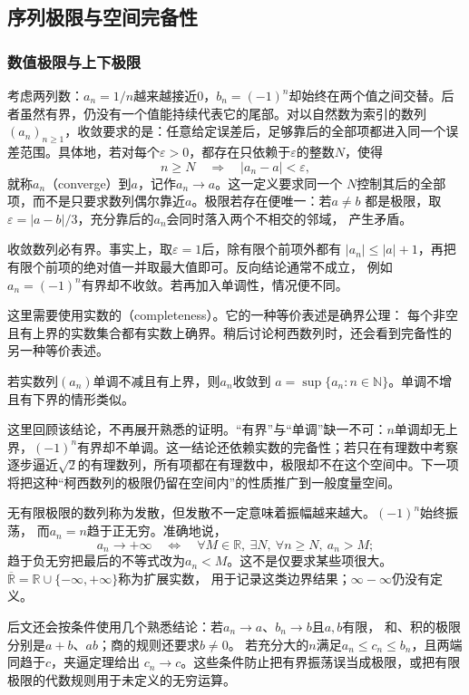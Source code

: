 \subsection{序列极限与空间完备性}
\subsubsection{数值极限与上下极限}

考虑两列数：$a_n=1/n$越来越接近$0$，$b_n=(-1)^n$却始终在两个值之间交替。后者虽然有界，仍没有一个值能持续代表它的尾部。对以自然数为索引的数列$(a_n)_{n\geq1}$，收敛要求的是：任意给定误差后，足够靠后的全部项都进入同一个误差范围。具体地，若对每个$\varepsilon>0$，都存在只依赖于$\varepsilon$的整数$N$，使得
\[   n\geq N\quad\Longrightarrow\quad |a_n-a|<\varepsilon, \]
就称$a_n$（converge）到$a$，记作$a_n\to a$。这一定义要求同一个 $N$控制其后的全部项，而不是只要求数列偶尔靠近$a$。极限若存在便唯一：若$a\neq b$ 都是极限，取$\varepsilon=|a-b|/3$，充分靠后的$a_n$会同时落入两个不相交的邻域， 产生矛盾。

收敛数列必有界。事实上，取$\varepsilon=1$后，除有限个前项外都有 $|a_n|\leq |a|+1$，再把有限个前项的绝对值一并取最大值即可。反向结论通常不成立， 例如$a_n=(-1)^n$有界却不收敛。若再加入单调性，情况便不同。

这里需要使用实数的（completeness）。它的一种等价表述是确界公理：
每个非空且有上界的实数集合都有实数上确界。稍后讨论柯西数列时，还会看到完备性的
另一种等价表述。
\begin{theorem}[单调有界收敛定理]
\label{thm:analysis-monotone-bounded-sequence}
若实数列$(a_n)$单调不减且有上界，则$a_n$收敛到 $a=\sup\{a_n:n\in\mathbb{N}\}$。单调不增且有下界的情形类似。
\end{theorem}
这里回顾该结论，不再展开熟悉的证明。“有界”与“单调”缺一不可：$n$单调却无上界，$(-1)^n$有界却不单调。这一结论还依赖实数的完备性；若只在有理数中考察逐步逼近$\sqrt{2}$的有理数列，所有项都在有理数中，极限却不在这个空间中。下一项将把这种“柯西数列的极限仍留在空间内”的性质推广到一般度量空间。

无有限极限的数列称为发散，但发散不一定意味着振幅越来越大。$(-1)^n$始终振荡，
而$a_n=n$趋于正无穷。准确地说，
\[
 a_n\to+\infty
 \quad\Longleftrightarrow\quad
 \forall M\in\mathbb R,\ \exists N,\ \forall n\geq N,\ a_n>M;
\]
趋于负无穷把最后的不等式改为$a_n<M$。这不是仅要求某些项很大。
$\overline{\mathbb R}=\mathbb R\cup\{-\infty,+\infty\}$称为扩展实数，
用于记录这类边界结果；$\infty-\infty$仍没有定义。

后文还会按条件使用几个熟悉结论：若$a_n\to a$、$b_n\to b$且$a,b$有限，
和、积的极限分别是$a+b$、$ab$；商的规则还要求$b\neq0$。
若充分大的$n$满足$a_n\leq c_n\leq b_n$，且两端同趋于$c$，夹逼定理给出
$c_n\to c$。这些条件防止把有界振荡误当成极限，或把有限极限的代数规则用于未定义的无穷运算。

